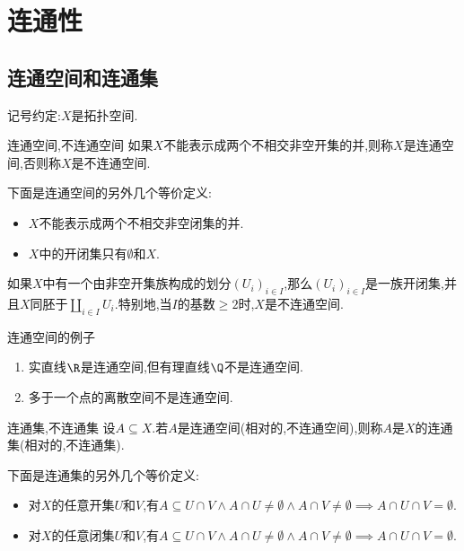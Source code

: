 \chapter{连通性}

\section{连通空间和连通集}

记号约定:$X$是拓扑空间.

\begin{definition}{连通空间,不连通空间}{}
	如果$X$不能表示成两个不相交非空开集的并,则称$X$是连通空间,否则称$X$是不连通空间.
\end{definition}

\begin{remark}{}{}
	下面是连通空间的另外几个等价定义:
	\begin{itemize}
		\item $X$不能表示成两个不相交非空闭集的并.
		\item $X$中的开闭集只有$\emptyset$和$X$.
	\end{itemize}
\end{remark}

\begin{remark}{}{}
	如果$X$中有一个由非空开集族构成的划分$\left(U_{i}\right)_{i\in I}$,那么$\left(U_{i}\right)_{i\in I}$是一族开闭集,并且$X$同胚于$\coprod\limits_{i\in I}U_{i}$.特别地,当$I$的基数$\geq 2$时,$X$是不连通空间.
\end{remark}

\begin{example}{连通空间的例子}{}
	\begin{enumerate}
		\item 实直线$\R$是连通空间,但有理直线$\Q$不是连通空间.
		\item 多于一个点的离散空间不是连通空间.
	\end{enumerate}
\end{example}

\begin{definition}{连通集,不连通集}{}
	设$A\subseteq X$.若$A$是连通空间(相对的,不连通空间),则称$A$是$X$的连通集(相对的,不连通集).
\end{definition}

\begin{remark}{}{}
	下面是连通集的另外几个等价定义:
	\begin{itemize}
		\item 对$X$的任意开集$U$和$V$,有$A\subseteq U\cap V\wedge A\cap U\neq\emptyset\wedge A\cap V\neq\emptyset\implies A\cap U\cap V=\emptyset$.
		\item 对$X$的任意闭集$U$和$V$,有$A\subseteq U\cap V\wedge A\cap U\neq\emptyset\wedge A\cap V\neq\emptyset\implies A\cap U\cap V=\emptyset$.
	\end{itemize}
\end{remark}

